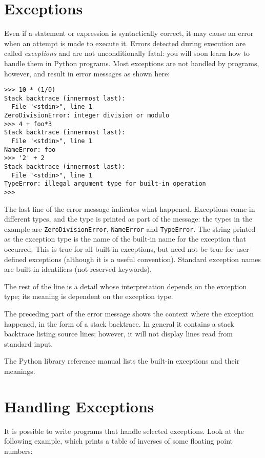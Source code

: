 \section{Exceptions}

Even if a statement or expression is syntactically correct, it may
cause an error when an attempt is made to execute it.
Errors detected during execution are called {\em exceptions} and are
not unconditionally fatal: you will soon learn how to handle them in
Python programs.  Most exceptions are not handled by programs,
however, and result in error messages as shown here:

\bcode\small\begin{verbatim}
>>> 10 * (1/0)
Stack backtrace (innermost last):
  File "<stdin>", line 1
ZeroDivisionError: integer division or modulo
>>> 4 + foo*3
Stack backtrace (innermost last):
  File "<stdin>", line 1
NameError: foo
>>> '2' + 2
Stack backtrace (innermost last):
  File "<stdin>", line 1
TypeError: illegal argument type for built-in operation
>>> 
\end{verbatim}\ecode
%
The last line of the error message indicates what happened.
Exceptions come in different types, and the type is printed as part of
the message: the types in the example are
{\tt ZeroDivisionError},
{\tt NameError}
and
{\tt TypeError}.
The string printed as the exception type is the name of the built-in
name for the exception that occurred.  This is true for all built-in
exceptions, but need not be true for user-defined exceptions (although
it is a useful convention).
Standard exception names are built-in identifiers (not reserved
keywords).

The rest of the line is a detail whose interpretation depends on the
exception type; its meaning is dependent on the exception type.

The preceding part of the error message shows the context where the
exception happened, in the form of a stack backtrace.
In general it contains a stack backtrace listing source lines; however,
it will not display lines read from standard input.

The Python library reference manual lists the built-in exceptions and
their meanings.

\section{Handling Exceptions}

It is possible to write programs that handle selected exceptions.
Look at the following example, which prints a table of inverses of
some floating point numbers:

